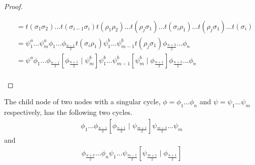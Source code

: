 \begin{proof}
\begin{enumerate}
\begin{align*}
			                    & =
			      t(\sigma_1\sigma_2) \dots t(\sigma_{i-1}\sigma_i) t(\rho_1\rho_2) \dots t(\rho_j \sigma_1) \dots t(\sigma_i\rho_1) \dots t(\rho_j\sigma_1) \dots t(\sigma_i) \\
			                    & =
			      \psi^a_1 \dots \psi^a_m
			      \phi_1 \dots \phi_{\frac{n-1}{2}} t(\sigma_i \rho_1)
			      \psi^b_1 \dots \psi^b_{m-1} t(\rho_j \sigma_1)
			      \phi_{\frac{n+3}{2}} \dots \phi_n                                                                                                                            \\
			                    & =
			      \psi^a
			      \phi_1 \dots \phi_{\frac{n-1}{2}} \left[\phi_{\frac{n+1}{2}} \mid \psi^b_m\right]
			      \psi^b_1 \dots \psi^b_{m-1} \left[\psi^b_m \mid \phi_{\frac{n+1}{2}}\right]
			      \phi_{\frac{n+3}{2}} \dots \phi_n                                                                                                                            \\
		      \end{align*}
	\end{enumerate}
\end{proof}

\begin{theorem}
	The child node of two nodes with a singular cycle, $\phi = \phi_1 \dots \phi_n$ and $\psi = \psi_1 \dots \psi_m$ respectively, has the following two cycles.
	\begin{align*}
		\phi_1 \dots \phi_{\frac{n-1}{2}} \left[\phi_{\frac{n+1}{2}} \mid \psi_{\frac{m+1}{2}}\right] \psi_{\frac{m+3}{2}} \dots \psi_m
	\end{align*}
	and
	\begin{align*}
		\phi_{\frac{n+3}{2}} \dots \phi_n \psi_1 \dots \psi_{\frac{m-1}{2}} \left[\psi_{\frac{m+1}{2}} \mid \phi_{\frac{n+1}{2}}\right]
	\end{align*}
\end{theorem}

